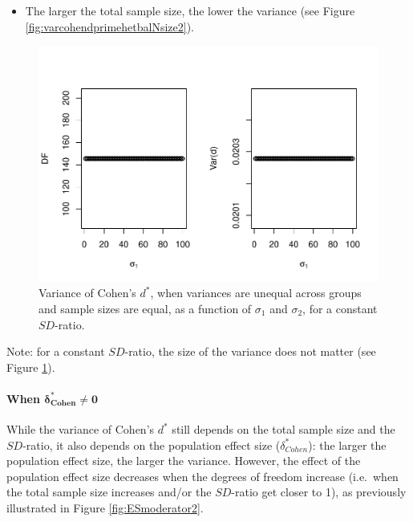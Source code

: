 \documentclass[
  english,
  man,mask]{apa6}
\providecommand{\tightlist}{%
  \setlength{\itemsep}{0pt}\setlength{\parskip}{0pt}}
\let\oldparagraph\paragraph
\renewcommand{\paragraph}[1]{\oldparagraph{#1}\mbox{}}
\begin{document}
\begin{itemize}
\tightlist
\item
  The larger the total sample size, the lower the variance (see Figure \ref{fig:varcohendprimehetbalNsize2}).
\end{itemize}

\begin{figure}
\centering
\includegraphics{Theoretical-Variance-of-all-estimators-as-a-function-of-population-parameters_files/figure-latex/varcohendprimehetbalvariance2-1.pdf}
\caption{\label{fig:varcohendprimehetbalvariance2}Variance of Cohen's \(d^*\), when variances are unequal across groups and sample sizes are equal, as a function of \(\sigma_1\) and \(\sigma_2\), for a constant \(SD\)-ratio.}
\end{figure}

Note: for a constant \(SD\)-ratio, the size of the variance does not matter (see Figure \ref{fig:varcohendprimehetbalvariance2}).

\hypertarget{when-bmdelta_cohen-neq-0-1}{%
\paragraph{\texorpdfstring{When \(\bm{\delta^*_{Cohen} \neq 0}\)}{When \textbackslash bm\{\textbackslash delta\^{}*\_\{Cohen\} \textbackslash neq 0\}}}\label{when-bmdelta_cohen-neq-0-1}}

While the variance of Cohen's \(d^*\) still depends on the total sample size and the \(SD\)-ratio, it also depends on the population effect size (\(\delta^*_{Cohen}\)): the larger the population effect size, the larger the variance. However, the effect of the population effect size decreases when the degrees of freedom increase (i.e.~when the total sample size increases and/or the \(SD\)-ratio get closer to 1), as previously illustrated in Figure \ref{fig:ESmoderator2}.
\end{document}
